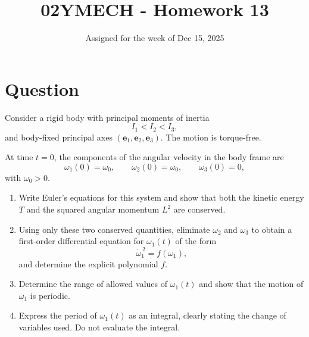 \documentclass[12pt]{article}
\title{02YMECH - Homework 13}
\date{Assigned for the week of Dec 15, 2025}
\author{}
\begin{document}
\maketitle

\section*{Question}

Consider a rigid body with principal moments of inertia
\[
I_1<I_2<I_3,
\]
and body-fixed principal axes
\((\mathbf e_1,\mathbf e_2,\mathbf e_3)\).
The motion is torque-free.

At time \(t=0\), the components of the angular velocity in the body frame
are
\[
\omega_1(0)=\omega_0,
\qquad
\omega_2(0)=\omega_0,
\qquad
\omega_3(0)=0,
\]
with \(\omega_0>0\).

\begin{enumerate}
  \item[(a)] Write Euler’s equations for this system and show that both the
        kinetic energy \(T\) and the squared angular momentum \(L^2\) are
        conserved.

  \item[(b)] Using only these two conserved quantities, eliminate
        \(\omega_2\) and \(\omega_3\) to obtain a first-order differential
        equation for \(\omega_1(t)\) of the form
        \[
        \dot{\omega}_1^{\,2}=f(\omega_1),
        \]
        and determine the explicit polynomial \(f\).

  \item[(c)] Determine the range of allowed values of \(\omega_1(t)\) and show
        that the motion of \(\omega_1\) is periodic.

  \item[(d)] Express the period of \(\omega_1(t)\) as an integral,
        clearly stating the change of variables used. Do not evaluate the
        integral.
\end{enumerate}
\end{document}
